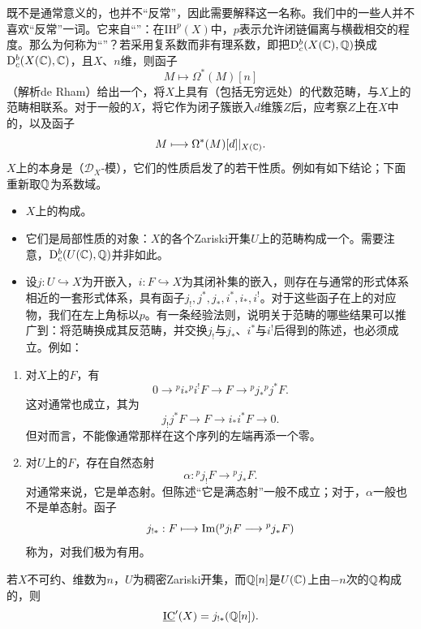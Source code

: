 既不是通常意义的，也并不“反常”，因此需要解释这一名称。我们中的一些人并不喜欢“反常”一词。它来自“”：在$\mathrm{IH}^p(X)$中，$p$表示允许闭链偏离与横截相交的程度。那么为何称为“”？若采用复系数而非有理系数，即把$\mathrm{D}_c^b(X(\mathbb C),\mathbb Q)$换成$\mathrm{D}_c^b(X(\mathbb C),\mathbb C)$，且$X$、$n$维，则函子
\[
M\longmapsto\Omega^*(M)[n]
\]
（解析de Rham）给出一个，将$X$上具有（包括无穷远处）的代数范畴，与$X$上的范畴相联系。对于一般的$X$，将它作为闭子簇嵌入$d$维簇$Z$后，应考察$Z$上在$X$中的，以及函子
\[
M\longmapsto\Omega^*(M)[d]|_{X(\mathbb C)}.
\]
$X$上的本身是（$\mathcal D_X$-模），它们的性质启发了的若干性质。例如有如下结论；下面重新取$\mathbb Q$为系数域。
\begin{itemize}
\item $X$上的构成。
\item 它们是局部性质的对象：$X$的各个Zariski开集$U$上的范畴构成一个。需要注意，$\mathrm{D}_c^b(U(\mathbb C),\mathbb Q)$并非如此。
\item 设$j:U\hookrightarrow X$为开嵌入，$i:F\hookrightarrow X$为其闭补集的嵌入，则存在与通常的形式体系相近的一套形式体系，具有函子$j_!,j^*,j_*,i^*,i_*,i^!$。对于这些函子在上的对应物，我们在左上角标以$p$。有一条经验法则，说明关于范畴的哪些结果可以推广到：将范畴换成其反范畴，并交换$j_!$与$j_*$、$i^*$与$i^!$后得到的陈述，也必须成立。例如：
\end{itemize}
\begin{enumerate}[label=\alph*)]
\item 对$X$上的$F$，有
\[
0\longrightarrow{}^pi_*{}^pi^!F\longrightarrow F
\longrightarrow{}^pj_*{}^pj^*F.
\]
这对通常也成立，其为
\[
j_!j^*F\longrightarrow F\longrightarrow i_*i^*F\longrightarrow0.
\]
但对而言，不能像通常那样在这个序列的左端再添一个零。
\item 对$U$上的$F$，存在自然态射
\[
\alpha:{}^pj_!F\longrightarrow{}^pj_*F.
\]
对通常来说，它是单态射。但陈述“它是满态射”一般不成立；对于，$\alpha$一般也不是单态射。函子
\[
j_{!*}:F\longmapsto\operatorname{Im}({}^pj_!F\longrightarrow{}^pj_*F)
\]
称为，对我们极为有用。
\end{enumerate}
若$X$不可约、维数为$n$，$U$为稠密Zariski开集，而$\mathbb Q[n]$是$U(\mathbb C)$上由$-n$次的$\mathbb Q$构成的，则
\[
\underline{\mathrm{IC}}'(X)=j_{!*}(\mathbb Q[n]).
\]

